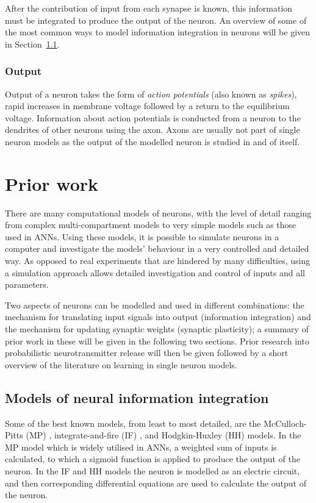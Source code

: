 \documentclass[a4paper,12pt]{report}
\theoremstyle{definition}
\begin{document}
After the contribution of input from each synapse is known, this information must be integrated to produce the output of the neuron. An overview of some of the most common ways to model information integration in neurons will be given in Section~\ref{subsec:modelsofintegration}.

\subsubsection{Output}

Output of a neuron takes the form of \emph{action potentials} (also known as \emph{spikes}), rapid increases in membrane voltage followed by a return to the equilibrium voltage. Information about action potentials is conducted from a neuron to the dendrites of other neurons using the axon. Axons are usually not part of single neuron models as the output of the modelled neuron is studied in and of itself.

\section{Prior work}


There are many computational models of neurons, with the level of detail ranging from complex multi-compartment models to very simple models such as those used in ANNs. Using these models, it is possible to simulate neurons in a computer and investigate the models' behaviour in a very controlled and detailed way. As opposed to real experiments that are hindered by many difficulties, using a simulation approach allows detailed investigation and control of inputs and all parameters.

Two aspects of neurons can be modelled and used in different combinations: the mechanism for translating input signals into output (information integration) and the mechanism for updating synaptic weights (synaptic plasticity); a summary of prior work in these will be given in the following two sections. Prior research into probabilistic neurotransmitter release will then be given followed by a short overview of the literature on learning in single neuron models.


\subsection{Models of neural information integration}
\label{subsec:modelsofintegration}

Some of the best known models, from least to most detailed, are the McCulloch-Pitts (MP) \cite{mcculloch1943logical}, integrate-and-fire (IF) \cite{abbott1999lapicque}, and Hodgkin-Huxley (HH) \cite{hodgkin1952quantitative} models. In the MP model which is widely utilised in ANNs, a weighted sum of inputs is calculated, to which a sigmoid function is applied to produce the output of the neuron. In the IF and HH models the neuron is modelled as an electric circuit, and then corresponding differential equations are used to calculate the output of the neuron.
\end{document}
